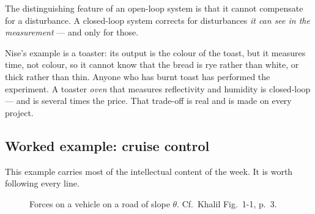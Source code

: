 \documentclass[11pt,a4paper]{article}
\begin{document}
\begin{keyidea}
The distinguishing feature of an open-loop system is that it cannot compensate
for a disturbance. A closed-loop system corrects for disturbances \emph{it can
see in the measurement} --- and only for those.
\end{keyidea}

Nise's example is a toaster: its output is the colour of the toast, but it
measures time, not colour, so it cannot know that the bread is rye rather than
white, or thick rather than thin. Anyone who has burnt toast has performed the
experiment. A toaster \emph{oven} that measures reflectivity and humidity is
closed-loop --- and is several times the price. That trade-off is real and is
made on every project.

\subsection{Worked example: cruise control}

This example carries most of the intellectual content of the week. It is worth
following every line.

\begin{figure}[htbp]
\centering
{}
\caption{Forces on a vehicle on a road of slope $\theta$. Cf.\ Khalil
Fig.~1-1, p.~3.}
\label{fig:car}
\end{figure}
\end{document}
